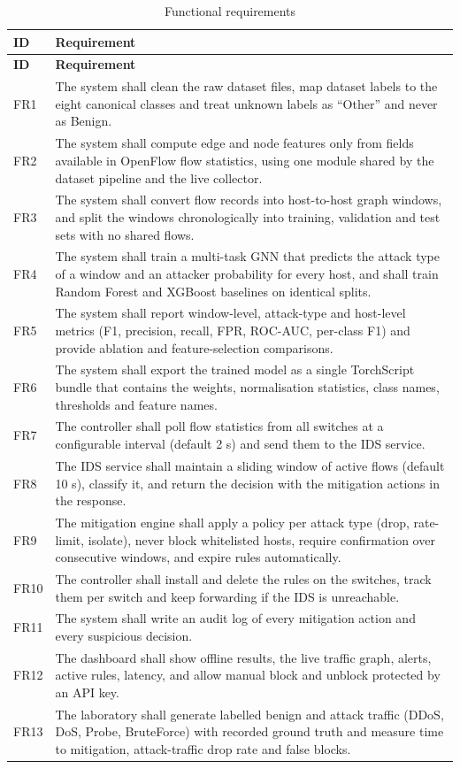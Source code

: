 \begin{longtable}{|p{1.3cm}|p{12.5cm}|}
\caption{Functional requirements}\label{tab:fr}\\
\hline
\textbf{ID} & \textbf{Requirement} \\ \hline
\endfirsthead
\hline \textbf{ID} & \textbf{Requirement} \\ \hline
\endhead
FR1 & The system shall clean the raw dataset files, map dataset labels to the eight canonical classes and treat unknown labels as ``Other'' and never as Benign. \\ \hline
FR2 & The system shall compute edge and node features only from fields available in OpenFlow flow statistics, using one module shared by the dataset pipeline and the live collector. \\ \hline
FR3 & The system shall convert flow records into host-to-host graph windows, and split the windows chronologically into training, validation and test sets with no shared flows. \\ \hline
FR4 & The system shall train a multi-task GNN that predicts the attack type of a window and an attacker probability for every host, and shall train Random Forest and XGBoost baselines on identical splits. \\ \hline
FR5 & The system shall report window-level, attack-type and host-level metrics (F1, precision, recall, FPR, ROC-AUC, per-class F1) and provide ablation and feature-selection comparisons. \\ \hline
FR6 & The system shall export the trained model as a single TorchScript bundle that contains the weights, normalisation statistics, class names, thresholds and feature names. \\ \hline
FR7 & The controller shall poll flow statistics from all switches at a configurable interval (default 2 s) and send them to the IDS service. \\ \hline
FR8 & The IDS service shall maintain a sliding window of active flows (default 10 s), classify it, and return the decision with the mitigation actions in the response. \\ \hline
FR9 & The mitigation engine shall apply a policy per attack type (drop, rate-limit, isolate), never block whitelisted hosts, require confirmation over consecutive windows, and expire rules automatically. \\ \hline
FR10 & The controller shall install and delete the rules on the switches, track them per switch and keep forwarding if the IDS is unreachable. \\ \hline
FR11 & The system shall write an audit log of every mitigation action and every suspicious decision. \\ \hline
FR12 & The dashboard shall show offline results, the live traffic graph, alerts, active rules, latency, and allow manual block and unblock protected by an API key. \\ \hline
FR13 & The laboratory shall generate labelled benign and attack traffic (DDoS, DoS, Probe, BruteForce) with recorded ground truth and measure time to mitigation, attack-traffic drop rate and false blocks. \\ \hline
\end{longtable}


